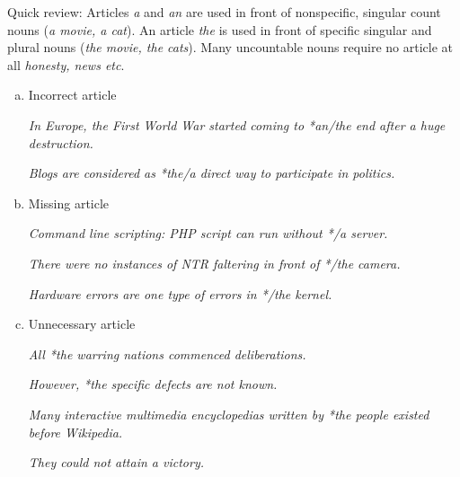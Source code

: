 \documentclass[12pt]{article}
\begin{document}
Quick review: Articles {\it a} and {\it an} are used in front of nonspecific, singular count nouns ({\it a movie, a cat}). An article {\it the} is used in front of specific singular and plural nouns ({\it the movie, the cats}). Many uncountable nouns require no article at all {\it honesty, news etc}. 
\begin{enumerate}[a)]
\item Incorrect article

{\it In Europe, the First World War started coming to *an/the end after a huge destruction.}

{\it Blogs are considered as *the/a direct way to participate in politics.}

\item Missing article

{\it Command line scripting: PHP script can run without */a server.}

{\it There were no instances of NTR faltering in front of */the camera.}

{\it Hardware errors are one type of errors in */the kernel.}


\item Unnecessary article

{\it All *the warring nations commenced deliberations.}

{\it However, *the specific defects are not known.}

{\it Many interactive multimedia encyclopedias written by *the people existed before Wikipedia.}

{\it They could not attain a victory.}
\end{enumerate}
\end{document}
